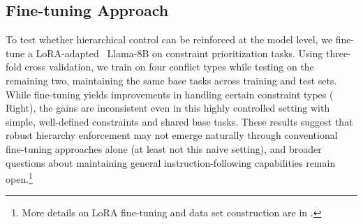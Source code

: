 \subsection{Fine-tuning Approach} 
To test whether hierarchical control can be reinforced at the model level, we fine-tune a LoRA-adapted~\citep{hu2021loralowrankadaptationlarge} Llama-8B on constraint prioritization tasks. Using three-fold cross validation, we train on four conflict types while testing on the remaining two, maintaining the same base tasks across training and test sets. While fine-tuning yields improvements in handling certain constraint types ( Right), the gains are inconsistent even in this highly controlled setting with simple, well-defined constraints and shared base tasks. These results suggest that robust hierarchy enforcement may not emerge naturally through conventional fine-tuning approaches alone (at least not this naive setting), and broader questions about maintaining general instruction-following capabilities remain open.\footnote{More details on LoRA fine-tuning and data set construction are in .}

